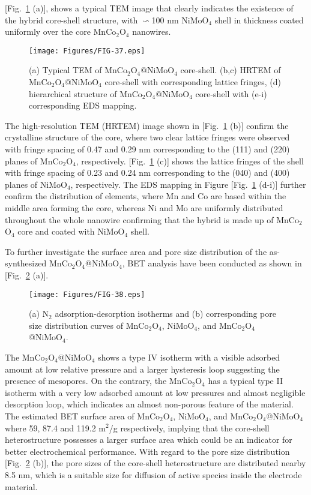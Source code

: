 \documentclass[reprint,amsmath,amssymb,aps,floatfix,
]{revtex4-2}
\begin{document}
[Fig.~\ref{fig:fig37} (a)], shows a typical TEM image that clearly indicates the existence of the hybrid core-shell structure, with $\backsim$100 nm NiMoO$_4$ shell in thickness coated uniformly over the core MnCo$_2$O$_4$ nanowires.
\begin{figure}[t]
    \centering
    \texttt{[image: Figures/FIG-37.eps]}
    \caption{\label{fig:fig37}(a) Typical TEM of MnCo$_2$O$_4$@NiMoO$_4$ core-shell. (b,c) HRTEM of MnCo$_2$O$_4$@NiMoO$_4$ core-shell with corresponding lattice fringes, (d) hierarchical structure of MnCo$_2$O$_4$@NiMoO$_4$ core-shell with (e-i) corresponding EDS mapping.}
    \end{figure}
The high-resolution TEM (HRTEM) image shown in [Fig.~\ref{fig:fig37} (b)] confirm the crystalline structure of the core, where two clear lattice fringes were observed with fringe spacing of 0.47 and 0.29 nm corresponding to the (111) and (220) planes of MnCo$_2$O$_4$, respectively. [Fig.~\ref{fig:fig37} (c)] shows the lattice fringes of the shell with fringe spacing of 0.23 and 0.24 nm corresponding to the (040) and (400) planes of NiMoO$_4$, respectively. The EDS mapping in Figure [Fig.~\ref{fig:fig37} (d-i)] further confirm the distribution of elements, where Mn and Co are based within the middle area forming the core, whereas Ni and Mo are uniformly distributed throughout the whole nanowire confirming that the hybrid is made up of MnCo$_2$O$_4$ core and coated with NiMoO$_4$ shell.

To further investigate the surface area and pore size distribution of the as-synthesized MnCo$_2$O$_4$@NiMoO$_4$, BET analysis have been conducted as shown in [Fig.~\ref{fig:fig38} (a)].
\begin{figure}[b]
    \centering
    \texttt{[image: Figures/FIG-38.eps]}
    \caption{\label{fig:fig38}(a) N$_2$ adsorption-desorption isotherms and (b) corresponding pore size distribution curves of MnCo$_2$O$_4$, NiMoO$_4$, and MnCo$_2$O$_4$@NiMoO$_4$.}
    \end{figure}
The MnCo$_2$O$_4$@NiMoO$_4$ shows a type IV isotherm with a visible adsorbed amount at low relative pressure and a larger hysteresis loop suggesting the presence of mesopores. On the contrary, the MnCo$_2$O$_4$ has a typical type II isotherm with a very low adsorbed amount at low pressures and almost negligible desorption loop, which indicates an almost non-porous feature of the material. The estimated BET surface area of MnCo$_2$O$_4$, NiMoO$_4$, and MnCo$_2$O$_4$@NiMoO$_4$ where 59, 87.4 and 119.2 m$^2$/g respectively, implying that the core-shell heterostructure possesses a larger surface area which could be an indicator for better electrochemical performance. With regard to the pore size distribution [Fig.~\ref{fig:fig38} (b)], the pore sizes of the core-shell heterostructure are distributed nearby 8.5 nm, which is a suitable size for diffusion of active species inside the electrode material.
\end{document}
